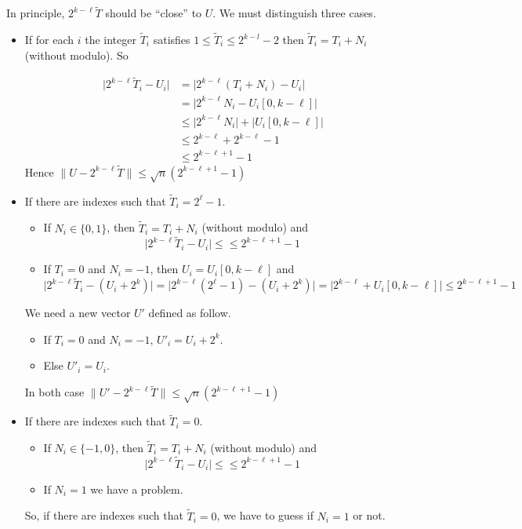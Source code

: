 \documentclass[preprint,svgnames]{iacrtrans}
\begin{document}
In principle, $2^{k-\ell} \widetilde{T}$ should be ``close'' to \(U\). We must distinguish three cases.
\begin{itemize}
	\item If for each \(i\) the integer \(\widetilde{T}_i\) satisfies \(1\leqslant\widetilde{T}_i\leqslant 2^{k-l}-2\) then \(\widetilde{T}_i = T_i + N_i\) (without modulo). So
	
	\begin{align*}
	\lvert 2^{k-\ell}\widetilde{T}_i-U_i \rvert &=\lvert 2^{k-\ell}(T_i + N_i)-U_i \rvert \\
	 &= \lvert 2^{k-\ell}N_i - U_i[0,k-\ell] \rvert\\
	 &\leqslant \lvert 2^{k-\ell}N_i\rvert + \lvert U_i[0,k-\ell] \rvert \\
	 &\leqslant 2^{k-\ell} + 2^{k-\ell}-1\\
	 &\leqslant 2^{k-\ell +1 }- 1
	\end{align*}
	Hence \(\lVert U -2^{k-\ell} \widetilde{T} \rVert \leqslant \sqrt{n}(2^{k-\ell+1}-1) \)
	
	\item If there are indexes such that \(\widetilde{T}_i = 2^\ell-1\).
	\begin{itemize}
		\item If \(N_i \in \{0,1\}\), then \(\widetilde{T}_i = T_i + N_i\) (without modulo) and \[\lvert 2^{k-\ell}\widetilde{T}_i-U_i \rvert \leqslant \leqslant 2^{k-\ell +1 }- 1\]
		\item If \(T_i = 0\) and \(N_i = -1\), then \(U_i=U_i[0,k-\ell]\) and  \[\lvert 2^{k-\ell}\widetilde{T}_i-(U_i + 2^k) \rvert =\lvert 2^{k-\ell}(2^\ell -1) -(U_i + 2^k) \rvert = \lvert 2^{k-\ell} + U_i[0,k-\ell]\rvert \leqslant 2^{k-\ell + 1} -1 \]
	\end{itemize}
	We need a new vector \(U'\) defined as follow.
	\begin{itemize}
		\item If \(T_i = 0\) and \(N_i = -1\), \(U'_i=U_i+2^k\).
		\item Else \(U'_i=U_i\).
	\end{itemize}
	In both case \(\lVert U' -2^{k-\ell} \widetilde{T} \rVert \leqslant \sqrt{n}(2^{k-\ell+1}-1) \)
	\item If there are indexes such that \(\widetilde{T}_i = 0\).
	\begin{itemize}
		\item  If  \(N_i \in \{-1,0\}\), then \(\widetilde{T}_i = T_i + N_i\) (without modulo) and \[\lvert 2^{k-\ell}\widetilde{T}_i-U_i \rvert \leqslant \leqslant 2^{k-\ell +1 }- 1\]
		\item If \(N_i = 1\) we have a problem.
	\end{itemize}
	So, if there are indexes such that \(\widetilde{T}_i = 0\), we have to guess if \(N_i=1\) or not.

\end{itemize}
\end{document}
